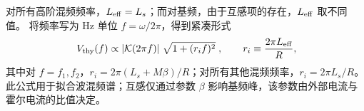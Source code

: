 对所有高阶混频频率，\(L_{\rm eff}=L_s\)；而对基频，由于互感项的存在，\(L_{\rm eff}\) 取不同值。
将频率写为 Hz 单位 \(f=\omega/2\pi\)，得到紧凑形式
\[
{\;
V_{\rm thy}(f) \propto \lvert\mathcal{K}(2\pi f)\rvert\;\sqrt{1+(r_i f)^2}\;},
\qquad
r_i \equiv \frac{2\pi L_{\rm eff}}{R},
\]
其中对 \(f=f_1,f_2\)，\(r_i = 2\pi(L_s+M\beta)/R\)；对所有其他混频频率，\(r_i = 2\pi L_s/R\)。
此公式用于拟合波混频谱；互感仅通过参数 \(\beta\) 影响基频峰，该参数由外部电流与霍尔电流的比值决定。